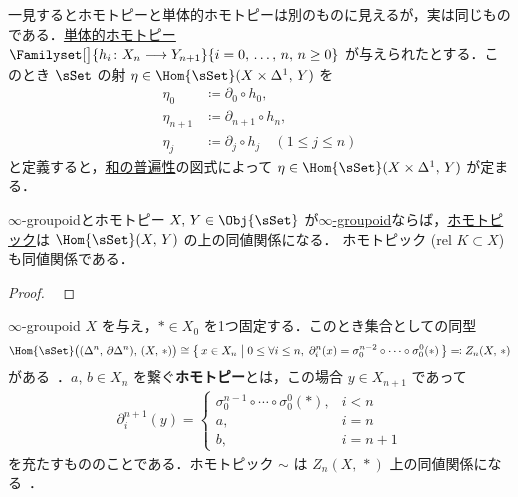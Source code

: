 \documentclass[TQFT_main]{subfiles}
\begin{document}
一見するとホモトピーと単体的ホモトピーは別のものに見えるが，実は同じものである．\hyperref[def:SimpSet-homotopy]{単体的ホモトピー} $\Familyset[\big]{h_i \colon X_n \lto Y_{n+1}}{i = 0,\, \dots,\, n,\, n \ge 0}$ が与えられたとする．このとき $\sSet$ の射 $\eta \in \Hom{\sSet}(X \times \Delta^1,\, Y)$ を
\begin{align}
    \eta_0 &\coloneqq \partial_0 \circ h_0, \\
    \eta_{n+1} &\coloneqq \partial_{n+1} \circ h_n, \\
    \eta_j &\coloneqq \partial_j \circ h_{j} \quad (1\le j \le n)
\end{align}
と定義すると，\hyperref[def:colim]{和の普遍性}の図式によって $\eta \in \Hom{\sSet}(X \times \Delta^1,\, Y)$ が定まる．

\begin{myprop}[label=prop:simphomotopy-equiv]{$\infty$-groupoidとホモトピー}
    $X,\, Y \in \Obj{\sSet}$ が\hyperref[def:infinity-1]{$\infty$-groupoid}ならば，\hyperref[def:SimpSet-homotopic]{ホモトピック}は $\Hom{\sSet} (X,\, Y)$ の上の同値関係になる．
    ホモトピック (rel $K \subset X$) も同値関係である．
\end{myprop}

\begin{proof}
    ~\cite[p.26, COROLLARY 6.2]{goerss2009simplicial}
\end{proof}

$\infty$-groupoid $X$ を与え，$* \in X_0$ を1つ固定する．このとき集合としての同型
\begin{align}
    \Hom{\sSet} \bigl( (\Delta^n,\, \partial\Delta^n),\, (X,\, *) \bigr) \cong \bigl\{\, x \in X_n \bigm|  0 \le \forall i \le n,\; \partial^n_i(x) = \sigma^{n-2}_0 \circ \cdots \circ \sigma^0_0 (*) \,\bigr\} \eqqcolon Z_n (X,\, *)
\end{align}
がある~\cite{SChen2024anomaly}．$a,\, b \in X_n$ を繋ぐ\textbf{ホモトピー}とは，この場合 $y \in X_{n+1}$ であって
\begin{align}
    \partial_i^{n+1} (y) =
    \begin{cases}
        \sigma^{n-1}_0 \circ \cdots \circ \sigma^0_0 (*), &i < n \\
        a, &i=n \\
        b, &i=n+1
    \end{cases}    
\end{align}
を充たすもののことである．ホモトピック $\sim$ は $Z_n(X,\, *)$ 上の同値関係になる~\cite[p.27, Lemma 3.28]{SChen2024anomaly}．
\end{document}
